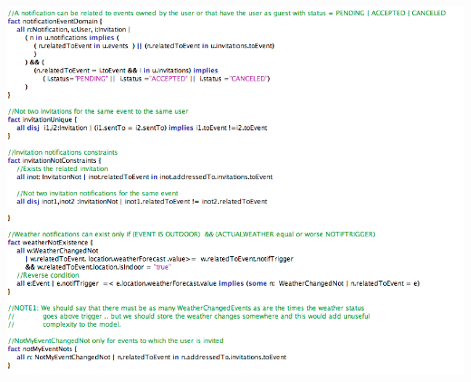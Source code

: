 \documentclass[12pt]{book}
\begin{document}
\includegraphics[width=19cm,height=21cm]{Alloy8}\\
\newpage
\end{document}
